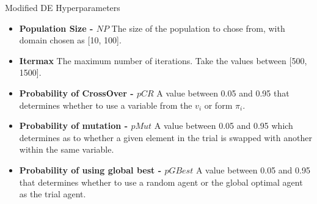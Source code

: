 \documentclass{beamer}
\begin{document}
\begin{frame}{Modified DE}
Hyperparameters
\begin{itemize}
      \item \textbf{Population Size - $NP$} The size of the population to chose from, with domain chosen as [10, 100].
      \item \textbf{{Itermax}} The maximum number of iterations. Take the values between [500, 1500].
      \item \textbf{Probability of CrossOver - $pCR$} A value between 0.05 and 0.95 that determines whether to use a variable from the $v_i$ or form $\pi_i$.
      \item \textbf{Probability of mutation - $pMut$} A value between 0.05 and 0.95 which determines as to whether a given element in the trial is swapped with another within the same variable.
      \item \textbf{Probability of using global best - $pGBest$} A value between 0.05 and 0.95 that determines whether to use a random agent or the global optimal agent as the trial agent.
    \end{itemize}
\end{frame}




\end{document}
